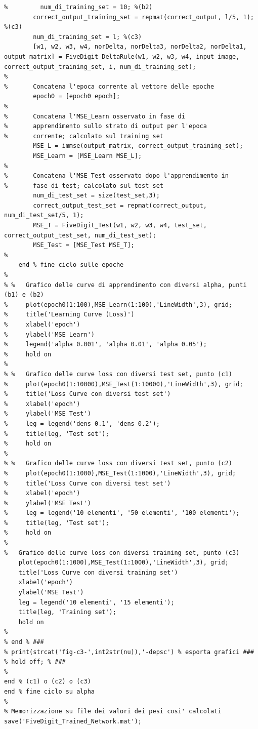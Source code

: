 \documentclass[a4paper,12pt]{article}
\begin{document}
\begin{lstlisting}[style=Matlab-editor,caption=\texttt{FiveDigit\_Training},title=\texttt{FiveDigit\_Training.mat},label=lst:training]
%         correct_output_training_set = repmat(correct_output, 2, 1); %(b2) 
%         num_di_training_set = 10; %(b2)
        correct_output_training_set = repmat(correct_output, l/5, 1); %(c3) 
        num_di_training_set = l; %(c3)
        [w1, w2, w3, w4, norDelta, norDelta3, norDelta2, norDelta1, output_matrix] = FiveDigit_DeltaRule(w1, w2, w3, w4, input_image, correct_output_training_set, i, num_di_training_set);
%
%       Concatena l'epoca corrente al vettore delle epoche
        epoch0 = [epoch0 epoch];
%
%       Concatena l'MSE_Learn osservato in fase di  
%       apprendimento sullo strato di output per l'epoca 
%       corrente; calcolato sul training set
        MSE_L = immse(output_matrix, correct_output_training_set);
        MSE_Learn = [MSE_Learn MSE_L];
%
%       Concatena l'MSE_Test osservato dopo l'apprendimento in
%       fase di test; calcolato sul test set
        num_di_test_set = size(test_set,3);
        correct_output_test_set = repmat(correct_output, num_di_test_set/5, 1);
        MSE_T = FiveDigit_Test(w1, w2, w3, w4, test_set, correct_output_test_set, num_di_test_set);
        MSE_Test = [MSE_Test MSE_T];
%
    end % fine ciclo sulle epoche
%
% %   Grafico delle curve di apprendimento con diversi alpha, punti (b1) e (b2)
%     plot(epoch0(1:100),MSE_Learn(1:100),'LineWidth',3), grid;
%     title('Learning Curve (Loss)')
%     xlabel('epoch')
%     ylabel('MSE Learn')
%     legend('alpha 0.001', 'alpha 0.01', 'alpha 0.05');
%     hold on
%
% %   Grafico delle curve loss con diversi test set, punto (c1)
%     plot(epoch0(1:10000),MSE_Test(1:10000),'LineWidth',3), grid;
%     title('Loss Curve con diversi test set')
%     xlabel('epoch')
%     ylabel('MSE Test')
%     leg = legend('dens 0.1', 'dens 0.2');
%     title(leg, 'Test set');
%     hold on
%
% %   Grafico delle curve loss con diversi test set, punto (c2)
%     plot(epoch0(1:1000),MSE_Test(1:1000),'LineWidth',3), grid;
%     title('Loss Curve con diversi test set')
%     xlabel('epoch')
%     ylabel('MSE Test')
%     leg = legend('10 elementi', '50 elementi', '100 elementi');
%     title(leg, 'Test set');
%     hold on
%
%   Grafico delle curve loss con diversi training set, punto (c3)
    plot(epoch0(1:1000),MSE_Test(1:1000),'LineWidth',3), grid;
    title('Loss Curve con diversi training set')
    xlabel('epoch')
    ylabel('MSE Test')
    leg = legend('10 elementi', '15 elementi');
    title(leg, 'Training set');
    hold on
%
% end % ###
% print(strcat('fig-c3-',int2str(nu)),'-depsc') % esporta grafici ###
% hold off; % ###
%
end % (c1) o (c2) o (c3)
end % fine ciclo su alpha
%
% Memorizzazione su file dei valori dei pesi cosi' calcolati
save('FiveDigit_Trained_Network.mat');
\end{lstlisting}
\end{document}
